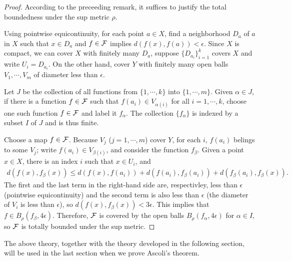 \begin{proof}
    According to the preceeding remark, it suffices to justify the total boundedness under the sup metric $\rho$.

    Using pointwise equicontinuity, for each point $a\in X$, find a neighborhood $D_a$ of $a$ in $X$ such that $x\in D_a$ and $f\in{\mathcal{F}}$ implies $d(f(x), f(a))<\epsilon$.
    Since $X$ is compact, we can cover $X$ with finitely many $D_a$, suppose $\{D_{a_i}\}_{i=1}^k$ covers $X$ and write $U_i=D_{a_i}$.
    On the other hand, cover $Y$ with finitely many open balls $V_1, \cdots, V_m$ of diameter less than $\epsilon$.

    Let $J$ be the collection of all functions from $\{1, \cdots, k\}$ into $\{1, \cdots, m\}$.
    Given $\alpha\in J$, if there is a function $f\in{\mathcal{F}}$ such that $f(a_i)\in V_{\alpha(i)}$ for all $i=1, \cdots, k$, choose one such function $f\in{\mathcal{F}}$ and label it $f_\alpha$.
    The collection $\{f_\alpha\}$ is indexed by a subset $I$ of $J$ and is thus finite.
    
    Choose a map $f\in{\mathcal{F}}$.
    Because $V_j$ ($j=1, \cdots, m$) cover $Y$, for each $i$, $f(a_i)$ belings to some $V_j$; write $f(a_i)\in V_{\beta(i)}$, and consider the function $f_\beta$.
    Given a point $x\in X$, there is an index $i$ such that $x\in U_i$, and
    \begin{align*}
        d(f(x), f_\beta(x)) \leq d(f(x), f(a_i))+d(f(a_i), f_\beta(a_i))+d(f_\beta(a_i), f_\beta(x)).
    \end{align*}
    The first and the last term in the right-hand side are, respectivley, less than $\epsilon$ (pointwise equicontinuity) and the second term is also less than $\epsilon$ (the diameter of $V_i$ is less than $\epsilon$), so $d(f(x), f_\beta(x))<3\epsilon$.
    This implies that $f\in B_\rho(f_\beta, 4\epsilon)$.
    Therefore, ${\mathcal{F}}$ is covered by the open balls $B_\rho(f_\alpha, 4\epsilon)$ for $\alpha\in I$, so ${\mathcal{F}}$ is totally bounded under the sup metric.
\end{proof}

The above theory, together with the theory developed in the following section, will be used in the last section when we prove Ascoli's theorem.